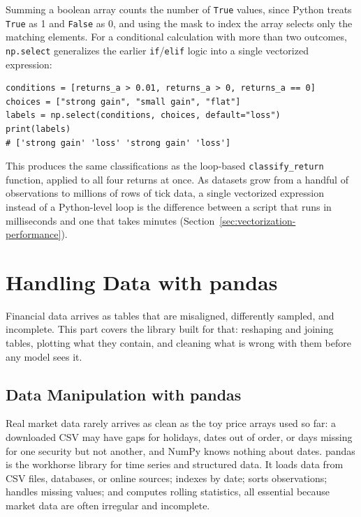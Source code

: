 \documentclass[../ai_in_finance]{subfiles}
\begin{document}
Summing a boolean array counts the number of \texttt{True} values, since Python treats \texttt{True} as 1 and \texttt{False} as 0, and using the mask to index the array selects only the matching elements. For a conditional calculation with more than two outcomes, \texttt{np.select} generalizes the earlier \texttt{if}/\texttt{elif} logic into a single vectorized expression:

\begin{verbatim}
conditions = [returns_a > 0.01, returns_a > 0, returns_a == 0]
choices = ["strong gain", "small gain", "flat"]
labels = np.select(conditions, choices, default="loss")
print(labels)
# ['strong gain' 'loss' 'strong gain' 'loss']
\end{verbatim}

This produces the same classifications as the loop-based \texttt{classify\_return} function, applied to all four returns at once. As datasets grow from a handful of observations to millions of rows of tick data, a single vectorized expression instead of a Python-level loop is the difference between a script that runs in milliseconds and one that takes minutes (Section~\ref{sec:vectorization-performance}).

\section{Handling Data with pandas}

Financial data arrives as tables that are misaligned, differently sampled, and incomplete. This part covers the library built for that: reshaping and joining tables, plotting what they contain, and cleaning what is wrong with them before any model sees it.

\subsection{Data Manipulation with pandas}

Real market data rarely arrives as clean as the toy price arrays used so far: a downloaded CSV may have gaps for holidays, dates out of order, or days missing for one security but not another, and NumPy knows nothing about dates. pandas is the workhorse library for time series and structured data. It loads data from CSV files, databases, or online sources; indexes by date; sorts observations; handles missing values; and computes rolling statistics, all essential because market data are often irregular and incomplete.
\end{document}
